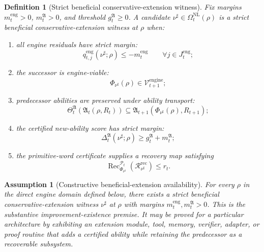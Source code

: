 \documentclass[11pt]{article}
\newtheorem{definition}[theorem]{Definition}
\newtheorem{assumption}[theorem]{Assumption}
\newcommand{\Pcal}{\mathcal{P}}
\newcommand{\Rcal}{\mathcal{R}}
\newcommand{\1}{\mathbf{1}}
\providecommand{\Vcal}{\mathcal{V}}
\providecommand{\Rec}{\operatorname{Rec}}
\begin{document}
\begin{definition}[Strict beneficial conservative-extension witness]
\label{def:strict_beneficial_ce_witness}
Fix margins \(m_t^{\mathrm{eng}}>0\), \(m_t^{\mathfrak A}>0\), and threshold \(g_t^{\mathfrak A}\ge0\).  A candidate \(\nu^\sharp\in\Omega_t^{\mathrm{NL}}(\rho)\) is a strict beneficial conservative-extension witness at \(\rho\) when:
\begin{enumerate}[label=(\roman*),leftmargin=1.5em]
    \item all engine residuals have strict margin:
    \[
    q_{t,j}^{\mathrm{eng}}(\nu^\sharp;\rho)\le -m_t^{\mathrm{eng}}
    \qquad\forall j\in J_t^{\mathrm{eng}};
    \]
    \item the successor is engine-viable:
    \[
    \Phi_{\nu^\sharp}(\rho)\in\Vcal_{t+1}^{\mathrm{engine}};
    \]
    \item predecessor abilities are preserved under ability transport:
    \[
    \Theta_t^{\mathfrak A}(\mathfrak A_t(\rho,R_t))
    \subseteq
    \mathfrak A_{t+1}(\Phi_{\nu^\sharp}(\rho),R_{t+1});
    \]
    \item the certified new-ability score has strict margin:
    \[
    \Delta_t^{\mathfrak A}(\nu^\sharp;\rho)
    \ge
    g_t^{\mathfrak A}+m_t^{\mathfrak A};
    \]
    \item the primitive-word certificate supplies a recovery map satisfying
    \[
    \Rec_{\Phi_{\nu^\sharp}}^{\Pcal_t}(\Rcal_{\nu^\sharp}^{\mathrm{rec}})
    \le r_t.
    \]
\end{enumerate}
\end{definition}

\begin{assumption}[Constructive beneficial-extension availability]
\label{ass:constructive_beneficial_extension_availability}
For every \(\rho\) in the direct engine domain defined below, there exists a strict beneficial conservative-extension witness \(\nu^\sharp\) at \(\rho\) with margins \(m_t^{\mathrm{eng}},m_t^{\mathfrak A}>0\).  This is the substantive improvement-existence premise.  It may be proved for a particular architecture by exhibiting an extension module, tool, memory, verifier, adapter, or proof routine that adds a certified ability while retaining the predecessor as a recoverable subsystem.
\end{assumption}
\end{document}

